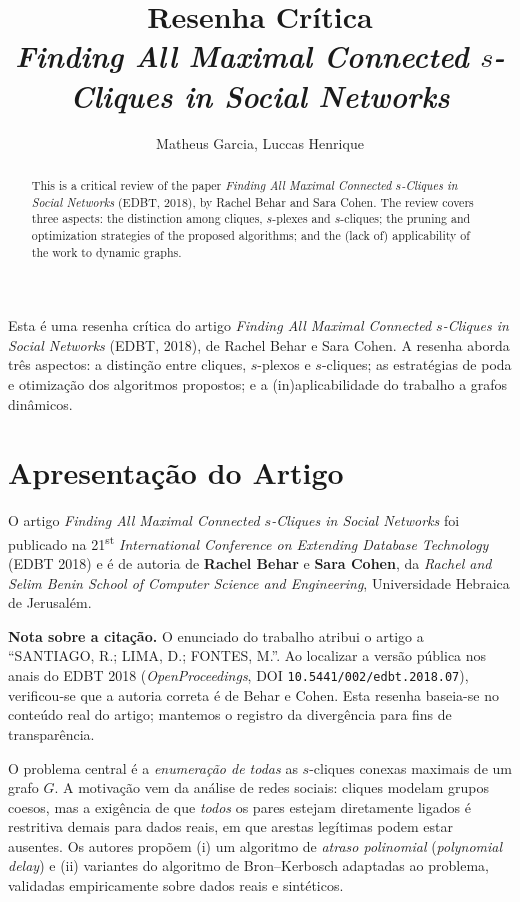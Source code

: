 \documentclass[12pt]{article}
\title{Resenha Crítica\\
\emph{Finding All Maximal Connected $s$-Cliques in Social Networks}}
\author{Matheus Garcia\inst{1}, Luccas Henrique\inst{1}}
\begin{document}
\maketitle

\begin{abstract}
This is a critical review of the paper \emph{Finding All Maximal Connected
$s$-Cliques in Social Networks} (EDBT, 2018), by Rachel Behar and Sara Cohen.
The review covers three aspects: the distinction among cliques, $s$-plexes and
$s$-cliques; the pruning and optimization strategies of the proposed algorithms;
and the (lack of) applicability of the work to dynamic graphs.
\end{abstract}

\begin{resumo}
Esta é uma resenha crítica do artigo \emph{Finding All Maximal Connected
$s$-Cliques in Social Networks} (EDBT, 2018), de Rachel Behar e Sara Cohen. A
resenha aborda três aspectos: a distinção entre cliques, $s$-plexos e
$s$-cliques; as estratégias de poda e otimização dos algoritmos propostos; e a
(in)aplicabilidade do trabalho a grafos dinâmicos.
\end{resumo}

\section{Apresentação do Artigo}

O artigo \emph{Finding All Maximal Connected $s$-Cliques in Social Networks}
\cite{behar2018} foi publicado na 21\textsuperscript{st} \emph{International
Conference on Extending Database Technology} (EDBT 2018) e é de autoria de
\textbf{Rachel Behar} e \textbf{Sara Cohen}, da \emph{Rachel and Selim Benin
School of Computer Science and Engineering}, Universidade Hebraica de Jerusalém.

\noindent\textbf{Nota sobre a citação.} O enunciado do trabalho atribui o artigo
a ``SANTIAGO, R.; LIMA, D.; FONTES, M.''. Ao localizar a versão pública nos anais
do EDBT 2018 (\emph{OpenProceedings}, DOI \texttt{10.5441/002/edbt.2018.07}),
verificou-se que a autoria correta é de Behar e Cohen. Esta resenha baseia-se no
conteúdo real do artigo; mantemos o registro da divergência para fins de
transparência.

O problema central é a \emph{enumeração de todas} as $s$-cliques conexas maximais
de um grafo $G$. A motivação vem da análise de redes sociais: cliques modelam
grupos coesos, mas a exigência de que \emph{todos} os pares estejam diretamente
ligados é restritiva demais para dados reais, em que arestas legítimas podem
estar ausentes. Os autores propõem (i) um algoritmo de \emph{atraso polinomial}
(\emph{polynomial delay}) e (ii) variantes do algoritmo de Bron--Kerbosch
adaptadas ao problema, validadas empiricamente sobre dados reais e sintéticos.
\end{document}
